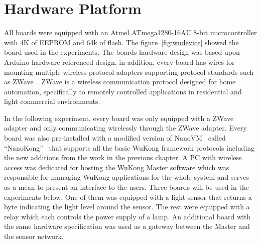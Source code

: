 \section{Hardware Platform}

All boards were equipped with an Atmel ATmega1280-16AU 8-bit microcontroller
with 4K of EEPROM and 64k of flash. The figure~\ref{fig:wudevice} showed the
board used in the experiments. The boards hardware design was based upon Arduino
hardware referenced design, in addition, every board has wires for mounting
multiple wireless protocol adapters supporting protocol standards such as
ZWave~\cite{ZWave}. ZWave is a wireless communication protocol designed for home
automation, specifically to remotely controlled applications in residential and
light commercial environments.

In the following experiment, every board was only equipped with a ZWave adapter
and only communicating wirelessly through the ZWave adapter.  Every board was
also pre-installed with a modified version of NanoVM~\cite{Harbaum2006} called
“NanoKong”~\cite{Su} that supports all the basic WuKong framework protocols
including the new additions from the work in the previous chapter.  A PC with
wireless access was dedicated for hosting the WuKong Master software which was
responsible for managing WuKong applications for the whole system and serves as
a mean to present an interface to the users.  Three boards will be used in the
experiments below. One of them was equipped with a light sensor that returns
a byte indicating the light level around the sensor.  The rest were equipped
with a relay which each controls the power supply of a lamp.  An additional
board with the same hardware specification was used as a gateway between the
Master and the sensor network.

